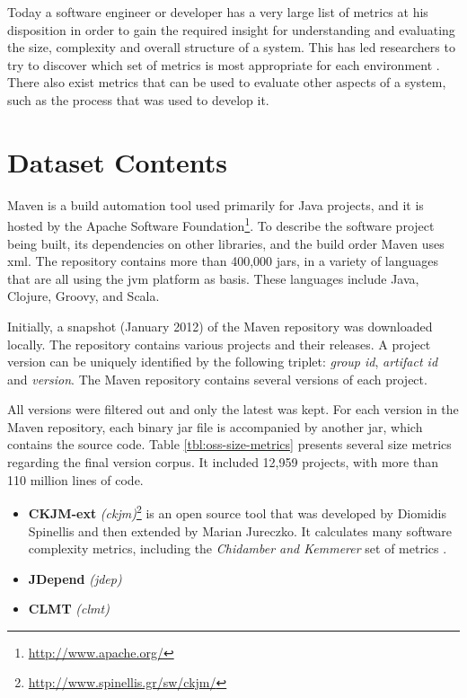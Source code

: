 \documentclass{sig-alternate}
\begin{document}
Today a software engineer or developer has a very large list of metrics at his disposition in order to gain the required insight for understanding and evaluating the size, complexity and overall structure of a system. This has led researchers to try to discover which set of metrics is most appropriate for each environment \cite{XSZC00,PUVA03,MAHA99,BRCA94}. There also exist metrics that can be used to evaluate other aspects of a system, such as the process that was used to develop it.

\section{Dataset Contents}
\label{sec:data}

 Maven is a build automation tool used primarily for Java projects, and it is hosted by the Apache Software Foundation\footnote{\url{http://www.apache.org/}}. To describe the software project being built, its dependencies on other libraries, and the build order Maven uses {\sc xml}. The repository contains more than 400,000 {\sc jar}s, in a variety of languages that are all using the {\sc jvm} platform as basis. These languages include Java, Clojure, Groovy, and Scala.

Initially, a snapshot (January 2012) of the Maven repository was downloaded locally. The repository contains various projects and their releases. A project version can be uniquely identified by the following triplet: {\it group id}, {\it artifact id} and {\it version}. The Maven repository contains several versions of each project.

All versions were filtered out and only the latest was kept. For each version in the Maven repository, each binary {\sc jar} file is accompanied by another {\sc jar}, which contains the source code. Table \ref{tbl:oss-size-metrics} presents several size metrics regarding the final version corpus. It included 12,959 projects, with more than 110 million lines of code.

\begin{itemize}
  \item \textbf{CKJM-ext} \textit{(ckjm)}\footnote{\url{http://www.spinellis.gr/sw/ckjm/}} is an open source tool that was developed by Diomidis Spinellis and then extended by Marian Jureczko. It calculates many software complexity metrics, including the \textit{Chidamber and Kemmerer} set of metrics \cite{CHKE94}.

  \item \textbf{JDepend} \textit{(jdep)}

  \item \textbf{CLMT} \textit{(clmt)}
\end{itemize}
\end{document}
